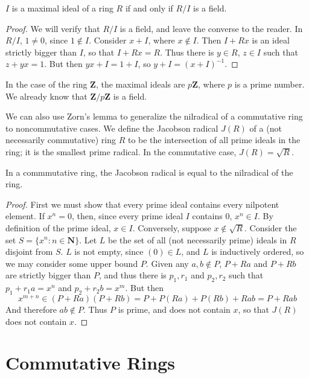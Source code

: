 \begin{theorem}
    $I$ is a maximal ideal of a ring $R$ if and only if $R/I$ is a field.
\end{theorem}
\begin{proof}
    We will verify that $R/I$ is a field, and leave the converse to the reader. In $R/I$, $1 \neq 0$, since $1 \not\in I$. Consider $x + I$, where $x \not\in I$. Then $I + Rx$ is an ideal strictly bigger than $I$, so that $I + Rx = R$. Thus there is $y \in R$, $z \in I$ such that $z + yx = 1$. But then $yx + I = 1 + I$, so $y + I = (x + I)^{-1}$.
\end{proof}

In the case of the ring $\mathbf{Z}$, the maximal ideals are $p\mathbf{Z}$, where $p$ is a prime number. We already know that $\mathbf{Z}/p\mathbf{Z}$ is a field.

We can also use Zorn's lemma to generalize the nilradical of a commutative ring to noncommutative cases. We define the Jacobson radical $J(R)$ of a (not necessarily commutative) ring $R$ to be the intersection of all prime ideals in the ring; it is the smallest prime radical. In the commutative case, $J(R) = \sqrt{R}$.

\begin{theorem}
    In a commmutative ring, the Jacobson radical is equal to the nilradical of the ring.
\end{theorem}
\begin{proof}
    First we must show that every prime ideal contains every nilpotent element. If $x^n = 0$, then, since every prime ideal $I$ contains $0$, $x^n \in I$. By definition of the prime ideal, $x \in I$. Conversely, suppose $x \not\in \sqrt{R}$. Consider the set $S = \{ x^n : n \in \mathbf{N} \}$. Let $L$ be the set of all (not necessarily prime) ideals in $R$ disjoint from $S$. $L$ is not empty, since $(0) \in L$, and $L$ is inductively ordered, so we may consider some upper bound $P$. Given any $a,b \not\in P$, $P + Ra$ and $P + Rb$ are strictly bigger than $P$, and thus there is $p_1,r_1$ and $p_2,r_2$ such that $p_1 + r_1a = x^n$ and $p_2 + r_2b = x^m$. But then
    \[ x^{m + n} \in (P + Ra)(P + Rb) = P + P(Ra) + P(Rb) + Rab = P + Rab \]
    And therefore $ab \notin P$. Thus $P$ is prime, and does not contain $x$, so that $J(R)$ does not contain $x$.
\end{proof}



\chapter{Commutative Rings}

